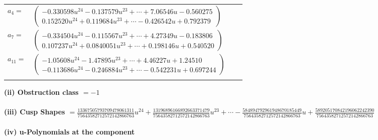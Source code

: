 \documentclass[1p]{elsarticle_modified}
\theoremstyle{definition}
\begin{document}
\begin{tabular}{m{7pt} m{180pt} m{7pt} m{180pt} }
\flushright $a_{4}=$&$\begin{pmatrix}-0.330598 u^{24}-0.137579 u^{23}+\cdots+7.06546 u-0.560275\\0.152520 u^{24}+0.119684 u^{23}+\cdots-0.426542 u+0.792379\end{pmatrix}$ \\
\flushright $a_{7}=$&$\begin{pmatrix}-0.334504 u^{24}-0.115567 u^{23}+\cdots+4.27349 u-0.183806\\0.107237 u^{24}+0.0840051 u^{23}+\cdots+0.198146 u+0.540520\end{pmatrix}$ \\
\flushright $a_{11}=$&$\begin{pmatrix}-1.05608 u^{24}-1.47895 u^{23}+\cdots+4.46227 u+1.24510\\-0.113686 u^{24}-0.246884 u^{23}+\cdots-0.542231 u+0.697244\end{pmatrix}$\\&\end{tabular}
\flushleft \textbf{(ii) Obstruction class $= -1$}\\~\\
\flushleft \textbf{(iii) Cusp Shapes $= \frac{13367505793709478061311}{75643582712572142866763} u^{24}+\frac{13196896166892663371479}{75643582712572142866763} u^{23}+\cdots-\frac{584894792961948670185449}{75643582712572142866763} u+\frac{589205170842196062242390}{75643582712572142866763}$}\\~\\
\newpage\renewcommand{\arraystretch}{1}
\flushleft \textbf{(iv) u-Polynomials at the component}\newline \\
\end{document}
